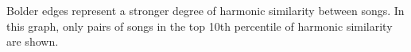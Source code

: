 Bolder edges represent a stronger degree of harmonic similarity between songs. In this graph, only pairs of songs in the top 10th percentile of harmonic similarity are shown.